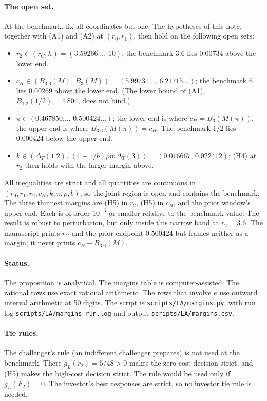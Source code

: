 \documentclass[12pt]{article}
\theoremstyle{remark}
\newcommand{\Dt}{\Delta_T}
\begin{document}
\paragraph{The open set.}
At the benchmark, fix all coordinates but one. The hypotheses of this note, together with (A1)
and (A2) at $(r_0,r_1)$, then hold on the following open sets:
\begin{itemize}
\item $r_2\in(r_C,h)=(3.59266\ldots,\,10)$; the benchmark $3.6$ lies $0.00734$ above the lower end.
\item $c_H\in(B_{3.6}(M),\,B_3(M))=(5.99731\ldots,\,6.21715\ldots)$; the benchmark $6$ lies
  $0.00269$ above the lower end. (The lower bound of (A1), $B_{1.2}(1/2)=4.804$, does not bind.)
\item $\pi\in(0.467850\ldots,\,0.500424\ldots)$; the lower end is where $c_H=B_3(M(\pi))$,
  the upper end is where $B_{3.6}(M(\pi))=c_H$. The benchmark $1/2$ lies $0.000424$ below the
  upper end.
\item $k\in(\Dt(1.2),\,(1-1/b)\rho m\Dt(3))=(0.016667,\,0.022412)$; (H4) at $r_2$ then holds
  with the larger margin above.
\end{itemize}
All inequalities are strict and all quantities are continuous in $(r_0,r_1,r_2,c_H,k,\pi,\rho,b)$,
so the joint region is open and contains the benchmark. The three thinnest margins are
(H5) in $r_2$, (H5) in $c_H$, and the prior window's upper end. Each is of order $10^{-3}$ or
smaller relative to the benchmark value. The result is robust to perturbation, but only inside
this narrow band at $r_2=3.6$. The manuscript prints $r_C$ and the prior endpoint $0.500424$
but frames neither as a margin; it never prints $c_H-B_{3.6}(M)$.

\paragraph{Status.}
The proposition is analytical. The margins table is computer-assisted. The rational rows use
exact rational arithmetic. The rows that involve $e$ use outward interval arithmetic at 50
digits. The script is \texttt{scripts/LA/margins.py}, with run log
\texttt{scripts/LA/margins\_run.log} and output \texttt{scripts/LA/margins.csv}.

\paragraph{Tie rules.}
The challenger's rule (an indifferent challenger prepares) is not used at the benchmark.
There $g_L(r_2)=5/48>0$ makes the zero-cost decision strict, and (H5) makes the high-cost
decision strict. The rule would be used only if $g_L(F_2)=0$. The investor's best responses are
strict, so no investor tie rule is needed.
\end{document}
